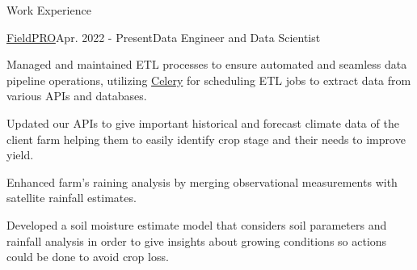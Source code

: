 \documentclass{resume} %
\begin{document}
\vspace{-0.2cm}
\begin{rSection}{Work Experience}

\begin{rSubsection}{\href{https://fieldpro.com.br/}{FieldPRO}}{Apr. 2022 - Present}{Data Engineer and Data Scientist}{}



\item Managed and maintained ETL processes to ensure automated and seamless data pipeline operations, utilizing \href{https://docs.celeryq.dev/en/stable/getting-started/introduction.html}{Celery} for scheduling ETL jobs to extract data from various APIs and databases.
\item Updated our APIs to give important historical and forecast climate data of the client farm helping them to easily identify crop stage and their needs to improve yield.%
\item Enhanced farm's raining analysis by merging observational measurements with satellite rainfall estimates.
\item Developed a soil moisture estimate model that considers soil parameters and rainfall analysis in order to give insights about growing conditions so actions could be done to avoid crop loss.%


\end{rSubsection}
\end{rSection}
\end{document}
